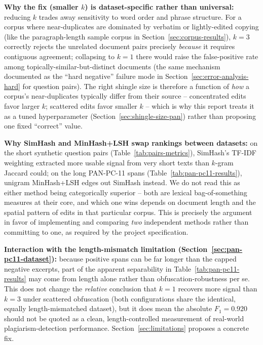 \documentclass[11pt]{article}
\begin{document}
\textbf{Why the fix (smaller $k$) is dataset-specific rather than universal:} reducing $k$ trades away
sensitivity to word order and phrase structure. For a corpus where near-duplicates are dominated by
verbatim or lightly-edited copying (like the paragraph-length sample corpus in
Section~\ref{sec:corpus-results}), $k=3$ correctly rejects the unrelated document pairs precisely \emph{because}
it requires contiguous agreement; collapsing to $k=1$ there would raise the false-positive rate among
topically-similar-but-distinct documents (the same mechanism documented as the ``hard negative'' failure
mode in Section~\ref{sec:error-analysis-hard} for question pairs). The right shingle size is therefore a
function of \emph{how} a corpus's near-duplicates typically differ from their source -- concentrated edits
favor larger $k$; scattered edits favor smaller $k$ -- which is why this report treats it as a tuned
hyperparameter (Section~\ref{sec:shingle-size-pan}) rather than proposing one fixed ``correct'' value.

\textbf{Why SimHash and MinHash+LSH swap rankings between datasets:} on the short synthetic question pairs
(Table~\ref{tab:pairs-metrics}), SimHash's TF-IDF weighting extracted more usable signal from very short
texts than $k$-gram Jaccard could; on the long PAN-PC-11 spans (Table~\ref{tab:pan-pc11-results}), unigram
MinHash+LSH edges out SimHash instead. We do not read this as either method being categorically superior --
both are lexical bag-of-something measures at their core, and which one wins depends on document length and
the spatial pattern of edits in that particular corpus. This is precisely the argument in favor of
implementing and comparing \emph{two} independent methods rather than committing to one, as required by the
project specification.

\textbf{Interaction with the length-mismatch limitation (Section~\ref{sec:pan-pc11-dataset}):} because
positive spans can be far longer than the capped negative excerpts, part of the apparent separability in
Table~\ref{tab:pan-pc11-results} may come from length alone rather than obfuscation-robustness per se. This
does not change the \emph{relative} conclusion that $k=1$ recovers more signal than $k=3$ under scattered
obfuscation (both configurations share the identical, equally length-mismatched dataset), but it does mean
the absolute $F_1=0.920$ should not be quoted as a clean, length-controlled measurement of real-world
plagiarism-detection performance. Section~\ref{sec:limitations} proposes a concrete fix.
\end{document}
